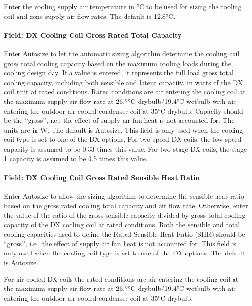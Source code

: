 Enter the cooling supply air temperature in °C to be used for sizing the cooling coil and zone supply air flow rates. The default is 12.8°C.

\paragraph{Field: DX Cooling Coil Gross Rated Total Capacity}\label{field-dx-cooling-coil-gross-rated-total-capacity}

Enter Autosize to let the automatic sizing algorithm determine the cooling coil gross total cooling capacity based on the maximum cooling loads during the cooling design day. If a value is entered, it represents the full load gross total cooling capacity, including both sensible and latent capacity, in watts of the DX coil unit at rated conditions. Rated conditions are air entering the cooling coil at the maximum supply air flow rate at 26.7°C drybulb/19.4°C wetbulb with air entering the outdoor air-cooled condenser coil at 35°C drybulb. Capacity should be the ``gross'', i.e., the effect of supply air fan heat is not accounted for. The units are in W. The default is Autosize. This field is only used when the cooling coil type is set to one of the DX options. For two-speed DX coils, the low-speed capacity is assumed to be 0.33 times this value. For two-stage DX coils, the stage 1 capacity is assumed to be 0.5 times this value.

\paragraph{Field: DX Cooling Coil Gross Rated Sensible Heat Ratio}\label{field-dx-cooling-coil-gross-rated-sensible-heat-ratio}

Enter Autosize to allow the sizing algorithm to determine the sensible heat ratio based on the gross rated cooling total capacity and air flow rate. Otherwise, enter the value of the ratio of the gross sensible capacity divided by gross total cooling capacity of the DX cooling coil at rated conditions. Both the sensible and total cooling capacities used to define the Rated Sensible Heat Ratio (SHR) should be ``gross'', i.e., the effect of supply air fan heat is not accounted for. This field is only used when the cooling coil type is set to one of the DX options. The default is Autosize.

For air-cooled DX coils the rated conditions are air entering the cooling coil at the maximum supply air flow rate at 26.7°C drybulb/19.4°C wetbulb with air entering the outdoor air-cooled condenser coil at 35°C drybulb.

